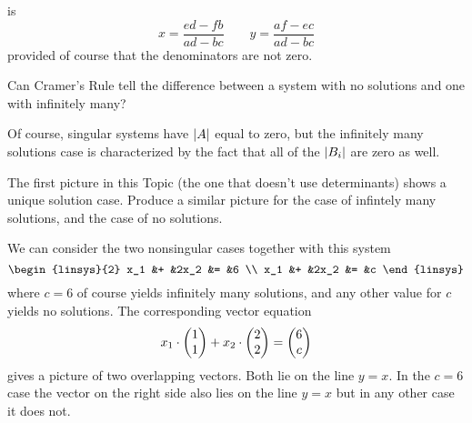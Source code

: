 \begin{exercises}
\begin{answer}
      is
      \begin{equation*}
        x=\frac{ed-fb}{ad-bc}
        \qquad
        y=\frac{af-ec}{ad-bc}
      \end{equation*}
      provided of course that the denominators are not zero.  
    \end{answer}
  \item
    Can Cramer's Rule tell the difference between a system with no
    solutions and one with infinitely many?
    \begin{answer}
      Of course, singular systems have \( \deter{A} \) equal to zero, but
      the infinitely many solutions case is characterized by the fact that
      all of the \( \deter{B_i} \) are zero as well.  
    \end{answer}
  \item 
    The first picture in this Topic (the one that doesn't use determinants)
    shows a unique solution case.
    Produce a similar picture for the case of infintely many solutions,
    and the case of no solutions.
    \begin{answer}
      We can consider the two nonsingular cases together with this
      system
      \begin{equation*}
        \begin{linsys}{2}
           x_1  &+  &2x_2  &=  &6  \\
           x_1  &+  &2x_2  &=  &c 
        \end{linsys}
      \end{equation*}
      where $c=6$ of course yields infinitely many solutions, and any other
      value for $c$ yields no solutions.  
      The corresponding vector equation
      \begin{equation*}
        x_1\cdot\begin{pmatrix} 1 \\ 1 \end{pmatrix}+x_2\cdot\begin{pmatrix} 2 \\ 2 \end{pmatrix}=\begin{pmatrix} 6 \\ c \end{pmatrix}
      \end{equation*}
      gives a picture of two overlapping vectors.
      Both lie on the line $y=x$.
      In the $c=6$ case the vector on the right side also lies on
      the line $y=x$ but in any other case it does not.
    \end{answer}  
\end{exercises}
\endinput

